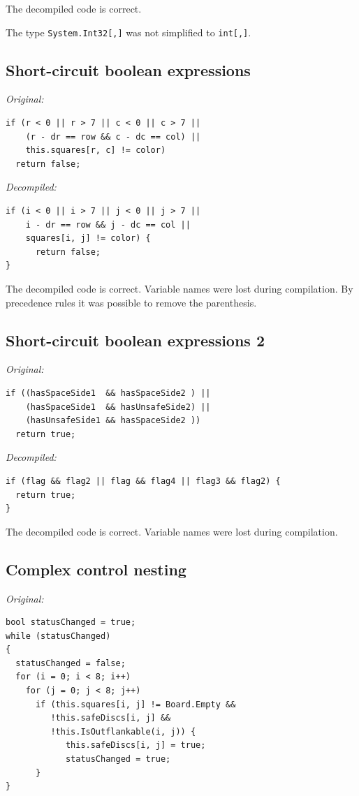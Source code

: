 \documentclass[12pt,twoside,notitlepage]{report}
\begin{document}
The decompiled code is correct.

The type \verb|System.Int32[,]| was not simplified to \verb|int[,]|.




\subsection{Short-circuit boolean expressions}

\emph{Original:}
\begin{verbatim}
if (r < 0 || r > 7 || c < 0 || c > 7 ||
    (r - dr == row && c - dc == col) ||
    this.squares[r, c] != color)
  return false;
\end{verbatim}

\emph{Decompiled:}
\begin{verbatim}
if (i < 0 || i > 7 || j < 0 || j > 7 ||
    i - dr == row && j - dc == col ||
    squares[i, j] != color) {
      return false;
}
\end{verbatim}


The decompiled code is correct.  Variable names were lost during compilation.
By precedence rules it was possible to remove the parenthesis.




\subsection{Short-circuit boolean expressions 2}

\emph{Original:}
\begin{verbatim}
if ((hasSpaceSide1  && hasSpaceSide2 ) ||
    (hasSpaceSide1  && hasUnsafeSide2) ||
    (hasUnsafeSide1 && hasSpaceSide2 ))
  return true;
\end{verbatim}

\emph{Decompiled:}
\begin{verbatim}
if (flag && flag2 || flag && flag4 || flag3 && flag2) {
  return true;
}
\end{verbatim}

The decompiled code is correct.  Variable names were lost during compilation.



\subsection{Complex control nesting}

\emph{Original:}
\begin{verbatim}
bool statusChanged = true;
while (statusChanged)
{
  statusChanged = false;
  for (i = 0; i < 8; i++)
    for (j = 0; j < 8; j++)
      if (this.squares[i, j] != Board.Empty &&
         !this.safeDiscs[i, j] && 
         !this.IsOutflankable(i, j)) {
            this.safeDiscs[i, j] = true;
            statusChanged = true;
      }
}
\end{verbatim}
\end{document}
